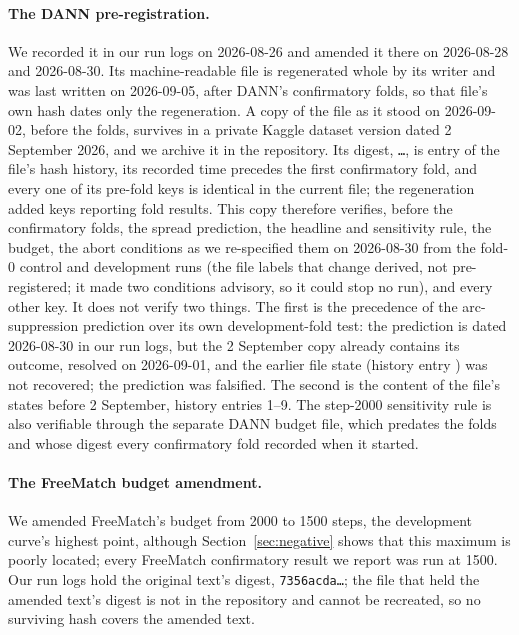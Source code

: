 \paragraph{The DANN pre-registration.} We recorded it in our run logs on 2026-08-26 and amended
it there on 2026-08-28 and 2026-08-30. Its machine-readable file is regenerated whole by its
writer and was last written on 2026-09-05, after DANN's confirmatory folds, so that file's own
hash dates only the regeneration. A copy of the file as it stood on 2026-09-02, before the
folds, survives in a private Kaggle dataset version dated 2 September 2026, and we archive it in
the repository. Its digest, \texttt{\dannPrefoldSha{}\ldots}, is entry \dannPrefoldEntry{} of the file's hash
history, its
recorded time precedes the first confirmatory fold, and every one of its
\dannPrefoldIdenticalKeys{} pre-fold keys is identical in the current file; the
regeneration added \dannPrefoldAddedKeys{} keys reporting fold results. This copy therefore
verifies, before the confirmatory folds, the spread prediction, the headline and sensitivity
rule, the budget, the abort conditions as we re-specified them on 2026-08-30 from the fold-0
control and development runs (the file labels that change derived, not pre-registered; it made
two conditions advisory, so it could stop no run), and every other key. It does not verify two things. The first is the precedence of the
arc-suppression prediction over its own development-fold test: the prediction is dated
2026-08-30 in our run logs, but the 2 September copy already contains its outcome, resolved on
2026-09-01, and the earlier file state (history entry \dannArcEntry{}) was not recovered; the
prediction was falsified. The second is the content of the file's states before 2 September,
history entries 1--9. The step-2000 sensitivity rule is also verifiable through the separate
DANN budget file, which predates the folds and whose digest every confirmatory fold recorded
when it started.

\paragraph{The FreeMatch budget amendment.} We amended FreeMatch's budget from 2000 to 1500
steps, the development curve's highest point, although Section~\ref{sec:negative} shows that
this maximum is poorly located; every FreeMatch confirmatory result we report was run
at 1500. Our run logs hold the original text's digest,
\texttt{7356acda\ldots}; the file that held the amended text's digest is not in the repository
and cannot be recreated, so no surviving hash covers the amended text.

